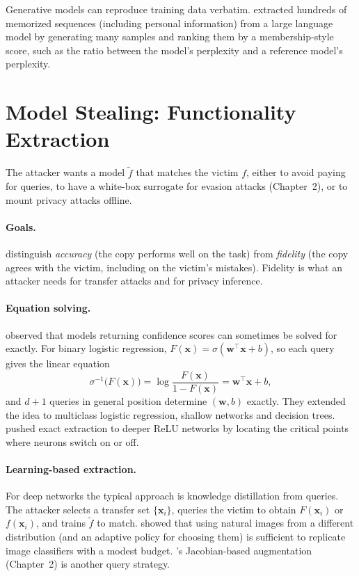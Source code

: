 \documentclass[10pt,a4paper]{extarticle}
\theoremstyle{definition}
\newcommand{\x}{\mathbf{x}}
\begin{document}
Generative models can reproduce training data verbatim. \citet{carlini2021extracting} extracted hundreds of memorized sequences (including personal information) from a large language model by generating many samples and ranking them by a membership-style score, such as the ratio between the model's perplexity and a reference model's perplexity.

\section{Model Stealing: Functionality Extraction}

The attacker wants a model \(\tilde f\) that matches the victim \(f\), either to avoid paying for queries, to have a white-box surrogate for evasion attacks (Chapter~2), or to mount privacy attacks offline.

\paragraph{Goals.} \citet{jagielski2020high} distinguish \emph{accuracy} (the copy performs well on the task) from \emph{fidelity} (the copy agrees with the victim, including on the victim's mistakes). Fidelity is what an attacker needs for transfer attacks and for privacy inference.

\paragraph{Equation solving.} \citet{tramer2016stealing} observed that models returning confidence scores can sometimes be solved for exactly. For binary logistic regression, \(F(\x)=\sigma(\mathbf{w}^\top\x+b)\), so each query gives the linear equation
\[
\sigma^{-1}\big(F(\x)\big) = \log\frac{F(\x)}{1-F(\x)} = \mathbf{w}^\top\x+b,
\]
and \(d+1\) queries in general position determine \((\mathbf{w},b)\) exactly. They extended the idea to multiclass logistic regression, shallow networks and decision trees. \citet{carlini2020cryptanalytic} pushed exact extraction to deeper ReLU networks by locating the critical points where neurons switch on or off.

\paragraph{Learning-based extraction.} For deep networks the typical approach is knowledge distillation from queries. The attacker selects a transfer set \(\{\x_i\}\), queries the victim to obtain \(F(\x_i)\) or \(f(\x_i)\), and trains \(\tilde f\) to match. \citet{orekondy2019knockoff} showed that using natural images from a different distribution (and an adaptive policy for choosing them) is sufficient to replicate image classifiers with a modest budget. \citet{papernot2017practical}'s Jacobian-based augmentation (Chapter~2) is another query strategy.
\end{document}
